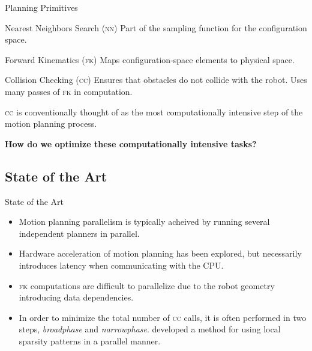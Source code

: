 \documentclass{beamer}
\begin{document}
\begin{frame}[label=p_primitives]{Planning Primitives}
\pause
\begin{block}{Nearest Neighbors Search (\textsc{nn})}
Part of the sampling function for the configuration space.
\end{block}

\begin{block}{Forward Kinematics (\textsc{fk})}
Maps configuration-space elements to physical space.
\end{block}

\begin{block}{Collision Checking (\textsc{cc})}
Ensures that obstacles do not collide with the robot. Uses many passes of \textsc{fk} in computation. 
\end{block}

\textsc{cc} is conventionally thought of as the most computationally intensive step of the motion planning process. \cite{paper:rrt90}%

\end{frame}

\begin{frame}
\centering
\textbf{How do we optimize these computationally intensive tasks?}
\end{frame}

\subsection{State of the Art}

\begin{frame}{State of the Art}
\begin{itemize}
\item Motion planning parallelism is typically acheived by running several independent planners in parallel. %
\item Hardware acceleration of motion planning has been explored, but necessarily introduces latency when communicating with the CPU.
\item \textsc{fk} computations are difficult to parallelize due to the robot geometry introducing data dependencies.
\item In order to minimize the total number of \textsc{cc} calls, it is often performed in two steps, \textit{broadphase} and \textit{narrowphase}. \cite{paper:eemp} developed a method for using local sparsity patterns in a parallel manner.
\end{itemize}
\end{frame}
\end{document}
